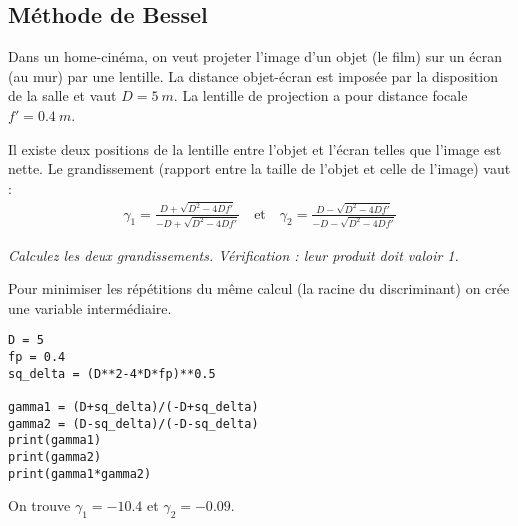 \subsection{Méthode de Bessel}
Dans un home-cinéma, on veut projeter l'image d'un objet (le film) sur un écran (au mur) par une lentille. La distance objet-écran est imposée par la disposition de la salle et vaut $D=\SI{5}{m}$. La lentille de projection a pour distance focale $f'=\SI{0.4}{m}$.

Il existe deux positions de la lentille entre l'objet et l'écran telles que l'image est nette. Le grandissement (rapport entre la taille de l'objet et celle de l'image) vaut :
	\begin{align*}
	\gamma_1=\frac{D+\sqrt{D^2-4Df'}}{-D+\sqrt{D^2-4Df'}}
	\quad\text{et}\quad
	\gamma_2=\frac{D-\sqrt{D^2-4Df'}}{-D-\sqrt{D^2-4Df'}}
	\end{align*}
\begin{Exercise}
{\it Calculez les deux grandissements. Vérification : leur produit doit valoir 1.}
\end{Exercise}
\begin{Answer}
Pour minimiser les répétitions du même calcul (la racine du discriminant) on crée une variable intermédiaire.
\begin{lstlisting}
D = 5
fp = 0.4
sq_delta = (D**2-4*D*fp)**0.5

gamma1 = (D+sq_delta)/(-D+sq_delta)
gamma2 = (D-sq_delta)/(-D-sq_delta)
print(gamma1)
print(gamma2)
print(gamma1*gamma2)
\end{lstlisting}

On trouve $\gamma_1=\num{-10,4}$ et $\gamma_2=\num{-0,09}$.
\end{Answer} 
